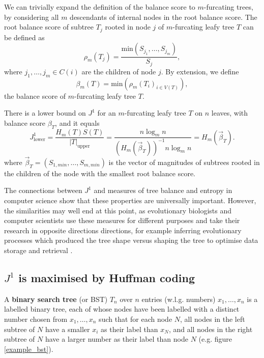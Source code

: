 \begin{remark}
    We can trivially expand the definition of the balance score to $m$-furcating
    trees, by considering all $m$ descendants of internal nodes in the root
    balance score. The root balance score of subtree $T_j$ rooted in node $j$
    of $m$-furcating leafy tree $T$ can be defined as
    \begin{equation}
        \rho_m(T_j) = \frac{\text{min}(S_{j_1}, \dots, S_{j_m})}{S_j},
    \end{equation}
    where $j_1,\dots,j_m\in C(i)$ are the children of node $j$. By extension, we define
    \begin{equation}
        \beta_m(T) = \text{min}(\rho_m(T_i)_{i\in V(T)}),
    \end{equation}
    the balance score of $m$-furcating leafy tree $T$.
\end{remark}

\begin{corollary}\label{j1_lower_bound_cor}
    There is a lower bound on $J^1$ for an $m$-furcating leafy tree $T$ on $n$
    leaves, with balance score $\beta_T$, and it equals
    \begin{equation}\label{j1_lower_bound}
        J^1_\text{lower} = \frac{H_m(T)S(T)}{|T|_\text{upper}} = \frac{n\log_mn}
        {(H_m(\vec\beta_T))^{-1}n\log_mn} = H_m(\vec\beta_T).
    \end{equation}
    where $\vec\beta_T = (S_{1,min}, \dots, S_{m, min})$ is the vector of
    magnitudes of subtrees rooted in the children of the node with the smallest
    root balance score.
\end{corollary}

The connections between $J^1$ and measures of tree balance and entropy in
computer science show that these properties are universally important.
However, the similarities may well end at this point, as evolutionary
biologists and computer scientists use these measures for different purposes
and take their research in opposite directions directions, for example inferring
evolutionary processes which produced the tree shape \citep{mooers_inferring_1997}
versus shaping the tree to optimise data storage and retrieval \citep{nagaraj_optimal_1997}.

\subsection{$J^1$ is maximised by Huffman coding}

\begin{definition}
    A \textbf{binary search tree} (or BST) $T_n$ over $n$ entries (w.l.g. numbers)
    $x_1,\dots,x_n$ is a labelled binary tree, each of whose nodes have been
    labelled with a distinct number chosen from $x_1,\dots,x_n$ such that for
    each node $N$, all nodes in the left subtree of $N$ have a smaller
    $x_i$ as their label than $x_N$, and all nodes in the right subtree of $N$
    have a larger number as their label than node $N$ (e.g. figure \ref{example_bst}).
\end{definition}

